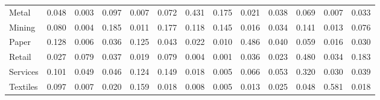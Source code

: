 \begin{table}[htbp]
\begin{tabular}{lcccccccccccc}
  Metal & \textcolor[RGB]{103,66,152}{0.048} & \textcolor[RGB]{248,160,7}{0.003} & \textcolor[RGB]{58,38,197}{0.097} & \textcolor[RGB]{225,146,30}{0.007} & \textcolor[RGB]{80,52,175}{0.072} & \textcolor[RGB]{12,8,243}{0.431} & \textcolor[RGB]{30,19,225}{0.175} & \textcolor[RGB]{163,105,92}{0.021} & \textcolor[RGB]{119,77,136}{0.038} & \textcolor[RGB]{85,55,170}{0.069} & \textcolor[RGB]{221,143,34}{0.007} & \textcolor[RGB]{135,87,120}{0.033} \\ 
  Mining & \textcolor[RGB]{69,45,186}{0.080} & \textcolor[RGB]{236,152,19}{0.004} & \textcolor[RGB]{25,16,230}{0.185} & \textcolor[RGB]{211,136,44}{0.011} & \textcolor[RGB]{28,18,227}{0.177} & \textcolor[RGB]{48,31,207}{0.118} & \textcolor[RGB]{37,24,218}{0.145} & \textcolor[RGB]{191,124,64}{0.016} & \textcolor[RGB]{129,84,126}{0.034} & \textcolor[RGB]{39,25,216}{0.141} & \textcolor[RGB]{204,132,51}{0.013} & \textcolor[RGB]{74,48,181}{0.076} \\ 
  Paper & \textcolor[RGB]{42,27,212}{0.128} & \textcolor[RGB]{230,149,25}{0.006} & \textcolor[RGB]{124,80,131}{0.036} & \textcolor[RGB]{44,29,211}{0.125} & \textcolor[RGB]{110,71,145}{0.043} & \textcolor[RGB]{158,102,97}{0.022} & \textcolor[RGB]{212,138,42}{0.010} & \textcolor[RGB]{7,5,248}{0.486} & \textcolor[RGB]{113,73,142}{0.040} & \textcolor[RGB]{90,58,165}{0.059} & \textcolor[RGB]{189,123,66}{0.016} & \textcolor[RGB]{143,93,112}{0.030} \\ 
  Retail & \textcolor[RGB]{147,95,108}{0.027} & \textcolor[RGB]{73,47,182}{0.079} & \textcolor[RGB]{122,79,133}{0.037} & \textcolor[RGB]{174,112,81}{0.019} & \textcolor[RGB]{71,46,184}{0.079} & \textcolor[RGB]{241,156,14}{0.004} & \textcolor[RGB]{253,164,2}{0.001} & \textcolor[RGB]{126,81,129}{0.036} & \textcolor[RGB]{154,100,101}{0.023} & \textcolor[RGB]{9,6,246}{0.480} & \textcolor[RGB]{131,85,124}{0.034} & \textcolor[RGB]{27,17,228}{0.183} \\ 
  Services & \textcolor[RGB]{55,36,200}{0.101} & \textcolor[RGB]{97,63,158}{0.049} & \textcolor[RGB]{106,69,149}{0.046} & \textcolor[RGB]{46,30,209}{0.124} & \textcolor[RGB]{35,23,220}{0.149} & \textcolor[RGB]{179,116,76}{0.018} & \textcolor[RGB]{232,150,23}{0.005} & \textcolor[RGB]{87,56,168}{0.066} & \textcolor[RGB]{94,61,161}{0.053} & \textcolor[RGB]{16,10,239}{0.320} & \textcolor[RGB]{140,91,115}{0.030} & \textcolor[RGB]{115,74,140}{0.039} \\ 
  Textiles & \textcolor[RGB]{57,37,198}{0.097} & \textcolor[RGB]{220,142,35}{0.007} & \textcolor[RGB]{168,109,87}{0.020} & \textcolor[RGB]{32,21,223}{0.159} & \textcolor[RGB]{182,118,73}{0.018} & \textcolor[RGB]{216,140,39}{0.008} & \textcolor[RGB]{234,151,21}{0.005} & \textcolor[RGB]{198,128,57}{0.013} & \textcolor[RGB]{152,99,103}{0.025} & \textcolor[RGB]{99,64,156}{0.048} & \textcolor[RGB]{2,1,253}{0.581} & \textcolor[RGB]{186,120,69}{0.018} \\ 

\end{tabular}
\end{table}
